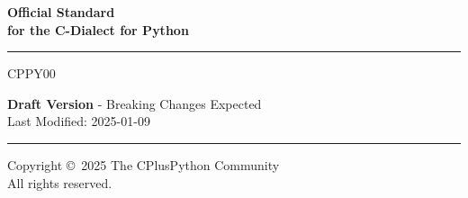 \begin{titlepage}
\begingroup
    \setlength{\parskip}{0pt}
    \vspace*{3cm}
    \begin{adjustwidth}{5cm}{0cm}

        {\selectfont \bfseries \Huge
        Official Standard \\
        for the C-Dialect for Python

        \rule{\linewidth}{1mm}

        \vspace*{1cm}

        CPPY00
        }

        \vspace*{8cm}

        {\selectfont \Large
        \textbf{Draft Version} - Breaking Changes Expected \\
        Last Modified: 2025-01-09
        }

        \vspace*{4cm}

        \rule{\linewidth}{0.5mm}

        {\selectfont \large
        Copyright \copyright \ 2025 The CPlusPython Community \\
        All rights reserved.
        
        }
    \end{adjustwidth}
\endgroup
\end{titlepage}
\newpage
\begingroup
\
\pagestyle{empty}
\cleardoublepage
\endgroup